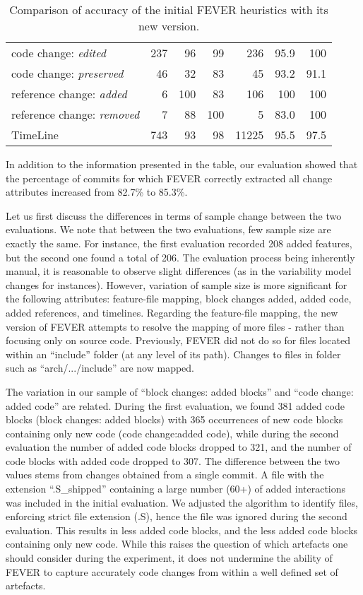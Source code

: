 \begin{table}[t]
{\begin{tabular}{|l|r|r|r||r|r|r|}
code change: \textit{edited}				& 237 & 96  & 99  & 236 & 95.9 & 100 	\\
code change: \textit{preserved}			&  46 & 32  & 83  & 45  & 93.2 & 91.1	\\
reference change: \textit{added}			& 6 & 100   & 83	  & 106  & 100 & 100		\\
reference change: \textit{removed}		& 7 & 88    & 100 & 5 	 & 83.0 & 100	\\
\hline
TimeLine 								& 743 & 93 & 98  & 11225 & 95.5 & 97.5\\
\hline
\end{tabular}
}
\caption{Comparison of accuracy of the initial FEVER heuristics \citep{dintzner_fever:_2016} with its new version.}
\label{review_attrs}
\end{table}

In addition to the information presented in the table, our evaluation showed that 
the percentage of commits for which FEVER correctly extracted all change attributes
increased from 82.7\% to 85.3\%.

Let us first discuss the differences in terms of sample change between the two evaluations. 
We note that between the two evaluations, few sample size are exactly the same.
For instance, the first evaluation recorded 208 added features, but the second one found a total of 206. 
The evaluation process being inherently manual, it is reasonable to observe slight differences (as in the variability model changes for instances).
However, variation of sample size is more significant for the following attributes: 
feature-file mapping, block changes added, added code, added references, and timelines. 
Regarding the feature-file mapping, the new version of FEVER attempts to resolve the mapping of more files 
- rather than focusing only on source code. 
Previously, FEVER did not do so for files located within an ``include'' folder (at any level of its path).
Changes to files in folder such as ``arch/.../include'' are now mapped.

The variation in our sample of ``block changes: added blocks'' and ``code change: added code'' are related. 
During the first evaluation, we found 381 added code blocks (block changes: added blocks) with 365 occurrences of new code blocks containing only new code (code change:added code),
while during the second evaluation the number of added code blocks dropped to 321, and the number of code blocks with added code
dropped to 307.
The difference between the two values stems from changes obtained from a single commit. A file with the extension ``.S\_shipped'' containing
a large number (60+) of added interactions was included in the initial evaluation. 
We adjusted the algorithm to identify files, enforcing strict file extension (.S), hence the file was ignored
during the second evaluation. This results in less added code blocks, and the less added code blocks containing only new code.
While this raises the question of which artefacts one should consider during the experiment, it does not
undermine the ability of FEVER to capture accurately code changes from within a well defined set of artefacts.

